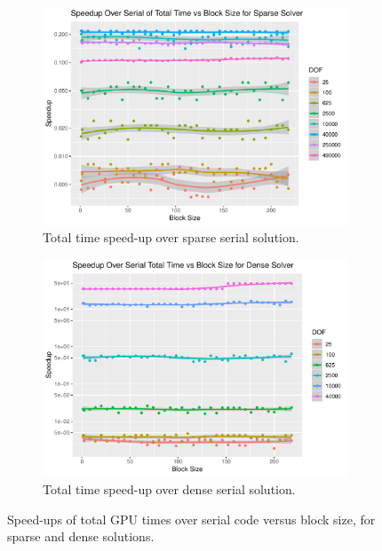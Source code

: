 \begin{figure}
	\centering
	\begin{subfigure}{0.48\linewidth}
		\centering
		\includegraphics[width = \linewidth]{Plots/total_sparse_cpu_speedup_vs_b}
		\caption{Total time speed-up over sparse serial solution.}
		\label{fig:tot_sparse_b}
	\end{subfigure}\hfill
	\begin{subfigure}{0.48\linewidth}
		\centering
		\includegraphics[width=\linewidth]{Plots/total_dense_cpu_speedup_vs_b}
		\caption{Total time speed-up over dense serial solution.}
		\label{fig:tot_dense_b}
	\end{subfigure}
	\caption{Speed-ups of total GPU times over serial code versus block size, for sparse and dense solutions.}
	\label{fig:tot_b}
\end{figure}

